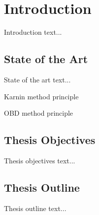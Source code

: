 \chapter{Introduction} \label{chap:introduction}
Introduction text...

\section{State of the Art} \label{sec:state_of_the_art}
State of the art text...  \citep{article:pruning_algorithms}

Karnin method principle

OBD method principle

\section{Thesis Objectives} \label{sec:thesis_objectives}
Thesis objectives text...

\section{Thesis Outline} \label{sec:thesis_outline}
Thesis outline text...